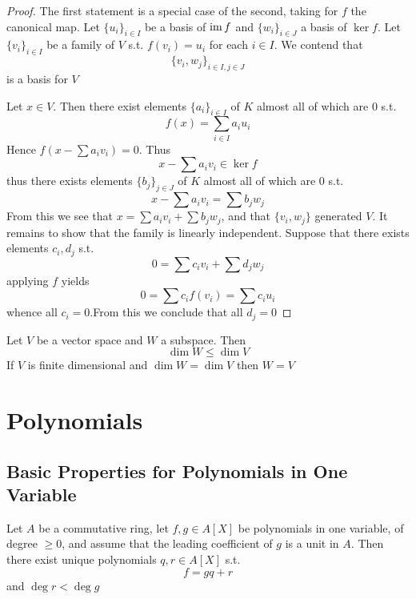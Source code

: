 \documentclass[11pt]{article}
\begin{document}
\begin{proof}
The first statement is a special case of the second, taking for \(f\) the canonical map.
Let \(\{u_i\}_{i\in I}\) be a basis of \(\operatorname{im} f\) and \(\{w_i\}_{i\in J}\) a basis of \(\ker f\).
Let \(\{v_i\}_{i\in I}\) be a family of \(V\) s.t. \(f(v_i)=u_i\) for each \(i\in I\). We contend that
\begin{equation*}
\{v_i,w_j\}_{i\in I,j\in J}
\end{equation*}
is a basis for \(V\)

Let \(x\in V\). Then there exist elements \(\{a_i\}_{i\in I}\) of \(K\) almost all of which are 0 s.t.
\begin{equation*}
f(x)=\sum_{i\in I}a_iu_i
\end{equation*}
Hence \(f(x-\sum a_iv_i)=0\). Thus
\begin{equation*}
x-\sum a_iv_i\in\ker f
\end{equation*}
thus there exists elements \(\{b_j\}_{j\in J}\) of \(K\) almost all of which are 0 s.t.
\begin{equation*}
x-\sum a_iv_i=\sum b_jw_j
\end{equation*}
From this we see that \(x=\sum a_iv_i+\sum b_jw_j\), and that \(\{v_i,w_j\}\) generated \(V\). It remains to
show that the family is linearly independent. Suppose that there exists elements \(c_i,d_j\) s.t.
\begin{equation*}
0=\sum c_iv_i+\sum d_jw_j
\end{equation*}
applying \(f\) yields
\begin{equation*}
0=\sum c_if(v_i)=\sum c_iu_i
\end{equation*}
whence all \(c_i=0\).From this we conclude that all \(d_j=0\)
\end{proof}

\begin{corollary}[]
Let \(V\) be a vector space and \(W\) a subspace. Then
\begin{equation*}
\dim W\le\dim V
\end{equation*}
If \(V\) is finite dimensional and \(\dim W=\dim V\) then \(W=V\)
\end{corollary}


\section{Polynomials}
\label{sec:orga6fd78d}
\subsection{Basic Properties for Polynomials in One Variable}
\label{sec:org87bcc36}
\begin{theorem}[]
Let \(A\) be a commutative ring, let \(f,g\in A[X]\)  be polynomials in one variable, of
degree \(\ge 0\), and assume that the leading coefficient of \(g\) is a unit in \(A\). Then there
exist unique polynomials \(q,r\in A[X]\) s.t.
\begin{equation*}
f=gq+r
\end{equation*}
and \(\deg r<\deg g\)
\end{theorem}
\end{document}
